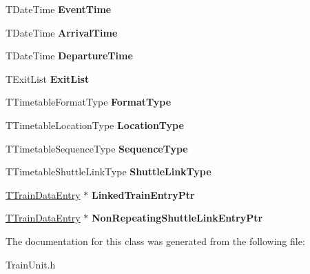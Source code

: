 \begin{DoxyCompactItemize}
T\+Date\+Time {\bfseries Event\+Time}
\item 
\mbox{\label{class_t_action_vector_entry_a590726f5c852a19625d7fdbed22469b0}} 
T\+Date\+Time {\bfseries Arrival\+Time}
\item 
\mbox{\label{class_t_action_vector_entry_a37c6ff0cda2672bbd60099487442fbb5}} 
T\+Date\+Time {\bfseries Departure\+Time}
\item 
\mbox{\label{class_t_action_vector_entry_ab1d7c2bc6c0dee48c74c3dd9c325ec4d}} 
T\+Exit\+List {\bfseries Exit\+List}
\item 
\mbox{\label{class_t_action_vector_entry_aaa45fd77d7d5f19350a0a7a8fbc05b13}} 
T\+Timetable\+Format\+Type {\bfseries Format\+Type}
\item 
\mbox{\label{class_t_action_vector_entry_a5de0c970525a897f8ac2cdf66004dab9}} 
T\+Timetable\+Location\+Type {\bfseries Location\+Type}
\item 
\mbox{\label{class_t_action_vector_entry_a67b29560b218e8b8ba854d326a630682}} 
T\+Timetable\+Sequence\+Type {\bfseries Sequence\+Type}
\item 
\mbox{\label{class_t_action_vector_entry_ae8efcbff8298cf829c26b0db65ffa6b3}} 
T\+Timetable\+Shuttle\+Link\+Type {\bfseries Shuttle\+Link\+Type}
\item 
\mbox{\label{class_t_action_vector_entry_ab240a52305bd614f1921e86617687abf}} 
\mbox{\hyperlink{class_t_train_data_entry}{T\+Train\+Data\+Entry}} $\ast$ {\bfseries Linked\+Train\+Entry\+Ptr}
\item 
\mbox{\label{class_t_action_vector_entry_a921897cd667dd8933de593e97e74a3a7}} 
\mbox{\hyperlink{class_t_train_data_entry}{T\+Train\+Data\+Entry}} $\ast$ {\bfseries Non\+Repeating\+Shuttle\+Link\+Entry\+Ptr}
\end{DoxyCompactItemize}


The documentation for this class was generated from the following file\+:\begin{DoxyCompactItemize}
\item 
Train\+Unit.\+h\end{DoxyCompactItemize}
